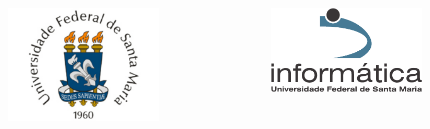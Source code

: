 \documentclass[xcolor={usenames,dvipsnames},10pt,compress,aspectratio=169]{beamer}
\begin{document}
\begin{frame}
  \frametitle{}
  \begin{center}
  \begin{columns}
    \begin{column}{0.5\textwidth}
    \raggedleft
\includegraphics[width=4cm]{logo_ufsm}
    \end{column}
    \begin{column}{0.5\textwidth}
\includegraphics[width=4cm]{logo_inf}
    \end{column}
  \end{columns}
\end{center}

\end{frame}
\end{document}
